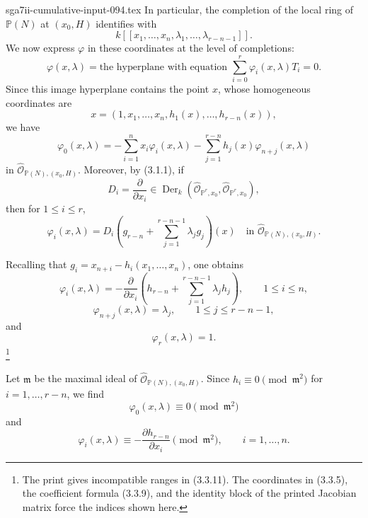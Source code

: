 \begin{filecontents*}{sga7ii-cumulative-input-094.tex}
In particular, the completion of the local ring of $\mathbb P(N)$ at
$(x_0,H)$ identifies with
\[
k[[x_1,\ldots,x_n,\lambda_1,\ldots,\lambda_{r-n-1}]].
\]
We now express $\varphi$ in these coordinates at the level of
completions:
\begin{equation}\tag{3.3.6}
\varphi(x,\lambda)
=\text{the hyperplane with equation }
\sum_{i=0}^{r}\varphi_i(x,\lambda)T_i=0.
\end{equation}
Since this image hyperplane contains the point $x$, whose homogeneous
coordinates are
\begin{equation}\tag{3.3.7}
x=(1,x_1,\ldots,x_n,h_1(x),\ldots,h_{r-n}(x)),
\end{equation}
we have
\begin{equation}\tag{3.3.8}
\varphi_0(x,\lambda)
=-\sum_{i=1}^{n}x_i\varphi_i(x,\lambda)
 -\sum_{j=1}^{r-n}h_j(x)\varphi_{n+j}(x,\lambda)
\end{equation}
in $\widehat{\mathcal O}_{\mathbb P(N),(x_0,H)}$.  Moreover, by
(3.1.1), if
\[
D_i=\frac{\partial}{\partial x_i}\in
\operatorname{Der}_k(
\widehat{\mathcal O}_{\mathbb P^r,x_0},
\widehat{\mathcal O}_{\mathbb P^r,x_0}),
\]
then for $1\leq i\leq r$,
\begin{equation}\tag{3.3.9}
\varphi_i(x,\lambda)
=D_i\!\left(g_{r-n}+
\sum_{j=1}^{r-n-1}\lambda_jg_j\right)(x)
\quad\text{in }\widehat{\mathcal O}_{\mathbb P(N),(x_0,H)}.
\end{equation}

Recalling that $g_i=x_{n+i}-h_i(x_1,\ldots,x_n)$, one obtains
\begin{equation}\tag{3.3.10}
\varphi_i(x,\lambda)
=-\frac{\partial}{\partial x_i}
\left(h_{r-n}+\sum_{j=1}^{r-n-1}\lambda_jh_j\right),
\qquad 1\leq i\leq n,
\end{equation}
\begin{equation}\tag{3.3.11}
\varphi_{n+j}(x,\lambda)=\lambda_j,
\qquad 1\leq j\leq r-n-1,
\end{equation}
and
\begin{equation}\tag{3.3.12}
\varphi_r(x,\lambda)=1.
\end{equation}
\footnote{The print gives incompatible ranges in (3.3.11).  The
coordinates in (3.3.5), the coefficient formula (3.3.9), and the
identity block of the printed Jacobian matrix force the indices shown
here.}

Let $\mathfrak m$ be the maximal ideal of
$\widehat{\mathcal O}_{\mathbb P(N),(x_0,H)}$.  Since
$h_i\equiv0\pmod{\mathfrak m^2}$ for $i=1,\ldots,r-n$, we find
\begin{equation}\tag{3.3.13}
\varphi_0(x,\lambda)\equiv0\pmod{\mathfrak m^2}
\end{equation}
and
\begin{equation}\tag{3.3.14}
\varphi_i(x,\lambda)
\equiv-\frac{\partial h_{r-n}}{\partial x_i}
\pmod{\mathfrak m^2},
\qquad i=1,\ldots,n.
\end{equation}
\end{filecontents*}
